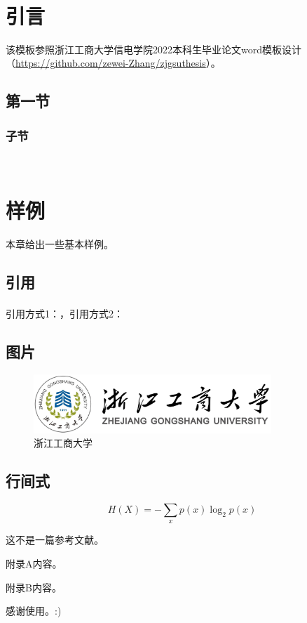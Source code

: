 \documentclass{zjgsuthesis}
\begin{document}

\initdoc






\directory
\startdoc


\clearpage
~
\vspace{-7mm}
\section{引言}
该模板参照浙江工商大学信电学院2022本科生毕业论文word模板设计（\href{https://github.com/zewei-Zhang/zjgsuthesis}{https://github.com/zewei-Zhang/zjgsuthesis}）。


\subsection{第一节}
\subsubsection{子节}


\clearpage
~
\vspace{-7mm}
\section{样例}
本章给出一些基本样例。


\subsection{引用}
引用方式1：\cite{sample}，引用方式2：\textsuperscript{\cite{sample}}


\subsection{图片}
\begin{figure}[htbp]
	\centering
	\includegraphics[width=0.8\textwidth]{zjgsu.png}
	\caption{浙江工商大学}
	\label{zjgsu}
\end{figure}


\subsection{行间式}
\begin{equation}
	H(X)=-\sum_{x}p(x)\log_2p(x)
\end{equation}

\clearpage
\begin{thebibliography}{30}
	\setref
	 这不是一篇参考文献。
\end{thebibliography}



\initappandices
{}
附录A内容。

附录B内容。

\acknowledgment
感谢使用。:)
\end{document}
